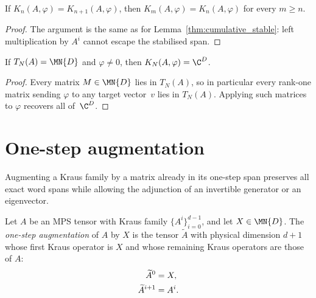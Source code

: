 \begin{lemma}\label{thm:vector_span_stable}
    \leanok
    If $K_n(A,\varphi)=K_{n+1}(A,\varphi)$, then
    $K_m(A,\varphi)=K_n(A,\varphi)$ for every $m\ge n$.
\end{lemma}

\begin{proof}\leanok{}
    The argument is the same as for Lemma~\ref{thm:cumulative_stable}:
    left multiplication by $A^i$ cannot escape the stabilised span.
\end{proof}

\begin{lemma}\label{lem:vector_span_from_matrix}
    \leanok
    If $T_N(A)=\MN{D}$ and $\varphi\neq0$, then
    $K_N(A,\varphi)=\C^D$.
\end{lemma}

\begin{proof}
    \leanok
    Every matrix $M\in\MN{D}$ lies in $T_N(A)$, so in particular every
    rank-one matrix sending $\varphi$ to any target vector~$v$ lies in
    $T_N(A)$. Applying such matrices to $\varphi$ recovers all of~$\C^D$.
\end{proof}

\section{One-step augmentation}
\label{sec:app_wielandt_augmentation}

Augmenting a Kraus family by a matrix already in its one-step span preserves all
exact word spans while allowing the adjunction of an invertible generator or an
eigenvector.

\begin{definition}\label{def:one_step_augment}
    \leanok
    Let $A$ be an MPS tensor with Kraus family
    $\{A^i\}_{i=0}^{d-1}$, and let $X\in\MN{D}$.
    The \emph{one-step augmentation} of $A$ by $X$ is the tensor
    $\widetilde A$ with physical dimension $d+1$ whose first Kraus operator
    is $X$ and whose remaining Kraus operators are those of $A$:
    \begin{align}
        \widetilde A^0
         & =X,
        \notag   \\
        \widetilde A^{i+1}
         & =A^i.
        \notag
    \end{align}
\end{definition}


